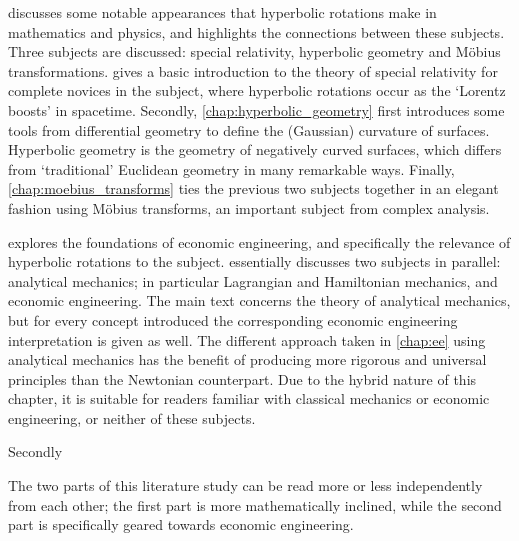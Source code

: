 \begin{description}
    \item{\textbf{}} discusses some notable appearances that hyperbolic rotations make in mathematics and physics, and highlights the connections between these subjects. Three subjects are discussed: special relativity, hyperbolic geometry and Möbius transformations.  gives a basic introduction to the theory of special relativity for complete novices in the subject, where hyperbolic rotations occur as the `Lorentz boosts' in spacetime. Secondly, \cref{chap:hyperbolic_geometry} first introduces some tools from differential geometry to define the (Gaussian) curvature of surfaces. Hyperbolic geometry is the geometry of negatively curved surfaces, which differs from `traditional' Euclidean geometry in many remarkable ways. Finally, \cref{chap:moebius_transforms} ties the previous two subjects together in an elegant fashion using Möbius transforms, an important subject from complex analysis.
    
    \item{\textbf{}} explores the foundations of economic engineering, and specifically the relevance of hyperbolic rotations to the subject.  essentially discusses two subjects in parallel: analytical mechanics; in particular Lagrangian and Hamiltonian mechanics, and economic engineering. The main text concerns the theory of analytical mechanics, but for every concept introduced the corresponding economic engineering interpretation is given as well.  The different approach taken in \cref{chap:ee} using analytical mechanics has the benefit of producing more rigorous and universal principles than the Newtonian counterpart. Due to the hybrid nature of this chapter, it is suitable for readers familiar with classical mechanics or economic engineering, or neither of these subjects. 
    
    Secondly
\end{description}

The two parts of this literature study can be read more or less independently from each other; the first part is more mathematically inclined, while the second part is specifically geared towards economic engineering.



